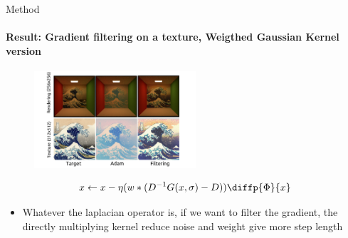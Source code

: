 \documentclass[beamer]{standalone}
\begin{document}
\begin{frame}{Method}
    \framesubtitle{Result: Gradient filtering on a texture, Weigthed Gaussian Kernel version}
        \begin{figure}[t]
            \includegraphics[width=6cm]{./figures/result-2.png}
        \centering
        \end{figure}
        \begin{equation}
            x \leftarrow x - \eta {(w*(D^{-1}G(x, \sigma)-D))}{\diffp{\Phi}{x}}
        \end{equation}
        \begin{itemize} 
            \item Whatever the laplacian operator is, if we want to filter the gradient, 
            the directly multiplying kernel reduce noise and weight give more step length
        \end{itemize}
        \begin{table}
            \centering
        \end{table}
    \note[item] {
    }
\end{frame}
\end{document}

